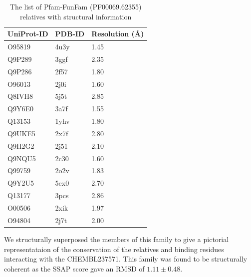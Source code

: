 \documentclass[a4paper, 11pt]{article}
\begin{document}
\begin{table}[H]
\centering
\caption{The list of Pfam-FunFam (PF00069.62355) relatives with structural information}
\label{pfam-62355}
\begin{tabular}{|l|l|l|}
\hline
UniProt-ID & PDB-ID & Resolution (Å) \\ \hline
O95819     & 4u3y   & 1.45           \\ \hline
Q9P289     & 3ggf   & 2.35           \\ \hline
Q9P286     & 2f57   & 1.80           \\ \hline
O96013     & 2j0i   & 1.60           \\ \hline
Q8IVH8     & 5j5t   & 2.85           \\ \hline
Q9Y6E0     & 3a7f   & 1.55           \\ \hline
Q13153     & 1yhv   & 1.80           \\ \hline
Q9UKE5     & 2x7f   & 2.80           \\ \hline
Q9H2G2     & 2j51   & 2.10           \\ \hline
Q9NQU5     & 2c30   & 1.60           \\ \hline
Q99759     & 2o2v   & 1.83           \\ \hline
Q9Y2U5     & 5ex0   & 2.70           \\ \hline
Q13177     & 3pcs   & 2.86           \\ \hline
O00506     & 2xik   & 1.97           \\ \hline
O94804     & 2j7t   & 2.00           \\ \hline
\end{tabular}
\end{table}
We structurally superposed the members of this family to give a pictorial representataion of the conservation of the relatives and binding residues interacting with the CHEMBL237571. This family was found to be structurally coherent as the SSAP score gave an RMSD of $1.11 \pm 0.48$. 
\end{document}
